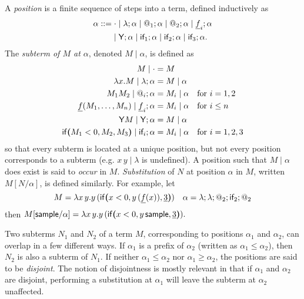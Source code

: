 A \emph{position} is a finite sequence of steps into a term, defined inductively as
\begin{align*}
\alpha ::= & \; {\cdot} \mid \lambda ; \alpha \mid @_1 ; \alpha \mid @_2 ; \alpha \mid \underline f_i ; \alpha \\
& {} \mid \mathsf{Y} ; \alpha \mid \textsf{if}_1 ; \alpha \mid \textsf{if}_2 ; \alpha \mid \textsf{if}_3 ; \alpha.
\end{align*}
The \emph{subterm of $M$ at $\alpha$}, denoted $M \mid \alpha$, is defined as
\begin{align*}
M \mid \cdot & = M \\
\lambda x. M \mid \lambda ; \alpha & = M \mid \alpha \\
M_1 M_2 \mid @_i ; \alpha & = M_i \mid \alpha \quad \text{for } i = 1,2 \\
\underline f(M_1,\dots,M_n) \mid \underline f_i ; \alpha & = M_i \mid \alpha \quad \text{for }i \leq n \\
\mathsf{Y} M \mid \mathsf{Y} ; \alpha & = M \mid \alpha \\
\mathsf{if}\boldsymbol{(}M_1 < 0, M_2, M_3\boldsymbol{)} \mid \textsf{if}_i ; \alpha & = M_i \mid \alpha \quad \text{for } i = 1,2,3
\end{align*}
so that every subterm is located at a unique position, but not every position corresponds to a subterm (e.g. $x \, y \mid \lambda$ is undefined). 
A position such that $M\mid \alpha$ does exist is said to \emph{occur} in $M$. 
\emph{Substitution} of $N$ at position $\alpha$ in $M$, written $M[N/\alpha]$, is defined similarly.
For example, let 
\[
M = \lambda x \, y. y \, (\mathsf{if}\boldsymbol{(}x < 0, y \, (\underline f (x)), \underline 3\boldsymbol{)})
\quad
\alpha =\lambda ; \lambda ; @_2 ; \textsf{if}_2 ; @_2
\]
then 
\(
M[\mathsf{sample} / \alpha] = \lambda x \, y. y \, (\mathsf{if}\boldsymbol{(}x < 0, y \, \mathsf{sample}, \underline 3\boldsymbol{)}).
\)

Two subterms $N_1$ and $N_2$ of a term $M$, corresponding to positions $\alpha_1$ and $\alpha_2$, can overlap in a few different ways. 
If $\alpha_1$ is a prefix of $\alpha_2$ (written as $\alpha_1 \leq \alpha_2$), then $N_2$ is also a subterm of $N_1$. If neither $\alpha_1 \leq \alpha_2$ nor $\alpha_1 \geq \alpha_2$, the positions are said to be \emph{disjoint}. 
The notion of disjointness is mostly relevant in that if $\alpha_1$ and $\alpha_2$ are disjoint, performing a substitution at $\alpha_1$ will leave the subterm at $\alpha_2$ unaffected.

